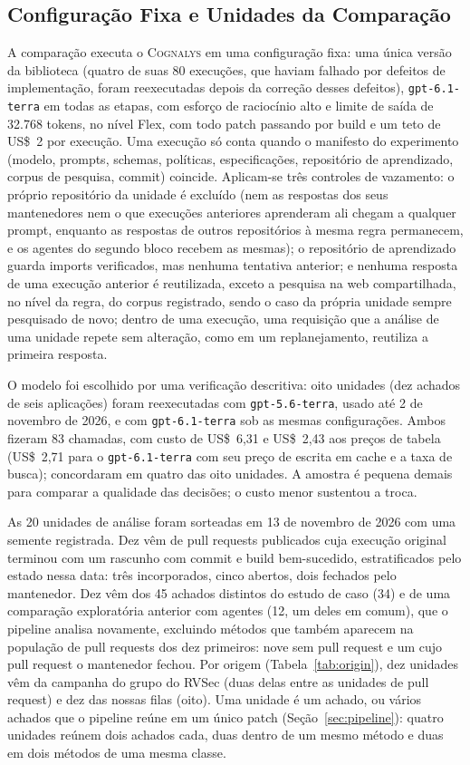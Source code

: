 \documentclass[conference]{IEEEtran}
\newcommand{\system}{\textsc{Cognalys}}
\begin{document}
\subsection{Configuração Fixa e Unidades da Comparação}
\label{subsec:frozen}

A comparação executa o {\system} em uma configuração fixa: uma única versão da biblioteca
(quatro de suas 80 execuções, que haviam falhado por defeitos de
implementação, foram reexecutadas depois da correção desses defeitos), \texttt{gpt-6.1-terra} em todas as etapas, com esforço de raciocínio
alto e limite de saída de 32.768 tokens, no nível Flex, com todo patch
passando por build e um teto de US\$~2 por execução. Uma execução só conta quando o manifesto do
experimento (modelo, prompts, schemas, políticas, especificações, repositório de aprendizado,
corpus de pesquisa, commit) coincide. Aplicam-se três controles de vazamento: o próprio
repositório da unidade é excluído (nem as respostas dos seus mantenedores nem o que execuções
anteriores aprenderam ali chegam a qualquer prompt, enquanto as respostas de outros repositórios à
mesma regra permanecem, e os agentes do segundo bloco recebem as mesmas); o
repositório de aprendizado guarda imports verificados, mas nenhuma tentativa anterior; e nenhuma resposta
de uma execução anterior é reutilizada, exceto a pesquisa na web compartilhada, no nível da regra, do
corpus registrado, sendo o caso da própria unidade sempre pesquisado de novo; dentro de
uma execução, uma requisição que a análise de uma unidade repete sem alteração, como
em um replanejamento, reutiliza a primeira resposta.

O modelo foi escolhido por uma verificação descritiva: oito unidades (dez achados de
seis aplicações) foram reexecutadas com \texttt{gpt-5.6-terra}, usado até
2 de novembro de 2026, e com \texttt{gpt-6.1-terra}
sob as mesmas configurações. Ambos fizeram 83 chamadas, com custo de US\$~6,31 e US\$~2,43
aos preços de tabela (US\$~2,71 para o \texttt{gpt-6.1-terra} com seu preço de escrita em cache
e a taxa de busca); concordaram em quatro das oito unidades. A amostra é pequena demais para comparar a qualidade das decisões;
o custo menor sustentou a troca.

As 20 unidades de análise foram sorteadas em 13 de novembro de 2026 com uma semente registrada.
Dez vêm de pull requests publicados cuja execução original terminou com um
rascunho com commit e build bem-sucedido, estratificados pelo estado nessa data: três incorporados, cinco
abertos, dois fechados pelo mantenedor. Dez vêm dos 45 achados distintos do estudo
de caso (34) e de uma comparação exploratória anterior com agentes (12, um deles
em comum), que o pipeline analisa novamente, excluindo métodos que também
aparecem na população de pull requests dos dez primeiros: nove sem
pull request e um cujo pull request o mantenedor fechou. Por origem
(Tabela~\ref{tab:origin}), dez unidades vêm da campanha do grupo do RVSec (duas
delas entre as unidades de pull request) e dez das nossas filas (oito). Uma unidade é um achado, ou
vários achados que o pipeline reúne em um único patch
(Seção~\ref{sec:pipeline}): quatro unidades reúnem dois achados cada, duas dentro
de um mesmo método e duas em dois métodos de uma mesma classe.
\end{document}
